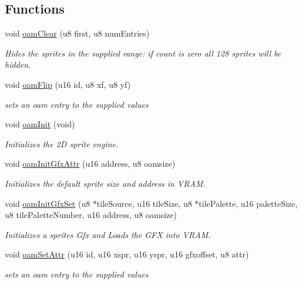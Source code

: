\subsection*{Functions}
\begin{DoxyCompactItemize}
\item 
void \hyperlink{a00350_a480021d319f990d930da8fc7fb11fce4}{oam\+Clear} (u8 first, u8 num\+Entries)
\begin{DoxyCompactList}\small\item\em Hides the sprites in the supplied range\+: if count is zero all 128 sprites will be hidden. \end{DoxyCompactList}\item 
void \hyperlink{a00350_af206f6568efabd13b1d65db1c2d4e24a}{oam\+Flip} (u16 id, u8 xf, u8 yf)
\begin{DoxyCompactList}\small\item\em sets an oam entry to the supplied values \end{DoxyCompactList}\item 
\mbox{\label{a00350_a274b5d953c60f5455937be288f6652ee}} 
void \hyperlink{a00350_a274b5d953c60f5455937be288f6652ee}{oam\+Init} (void)
\begin{DoxyCompactList}\small\item\em Initializes the 2D sprite engine. \end{DoxyCompactList}\item 
void \hyperlink{a00350_ad28cccee6dcd379989a0361fe868bddb}{oam\+Init\+Gfx\+Attr} (u16 address, u8 oamsize)
\begin{DoxyCompactList}\small\item\em Initializes the default sprite size and address in V\+R\+AM. \end{DoxyCompactList}\item 
void \hyperlink{a00350_a46e0be47f8fc865a7f43c1b0b126e59a}{oam\+Init\+Gfx\+Set} (u8 $\ast$tile\+Source, u16 tile\+Size, u8 $\ast$tile\+Palette, u16 palette\+Size, u8 tile\+Palette\+Number, u16 address, u8 oamsize)
\begin{DoxyCompactList}\small\item\em Initializes a sprites Gfx and Loads the G\+FX into V\+R\+AM. \end{DoxyCompactList}\item 
void \hyperlink{a00350_a9a76e12af57f5debf4df08c98820a2a5}{oam\+Set\+Attr} (u16 id, u16 xspr, u16 yspr, u16 gfxoffset, u8 attr)
\begin{DoxyCompactList}\small\item\em sets an oam entry to the supplied values \end{DoxyCompactList}\item 

\end{DoxyCompactItemize}

